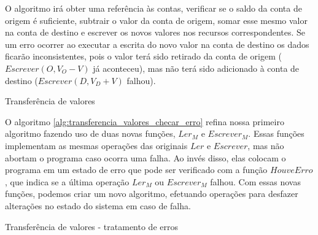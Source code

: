 \documentclass[11pt,twoside,a4paper]{book}
\begin{document}
O algoritmo irá obter uma referência às contas, verificar se o saldo da conta de origem é suficiente, subtrair o valor da conta de origem, somar esse mesmo valor na conta de destino e escrever os novos valores nos recursos correspondentes. Se um erro ocorrer ao executar a escrita do novo valor na conta de destino os dados ficarão inconsistentes, pois o valor terá sido retirado da conta de origem ($Escrever(O, V_O - V)$ já aconteceu), mas não terá sido adicionado à conta de destino ($Escrever(D, V_D + V)$ falhou).

\begin{algorithm}
\caption{Transferência de valores}
\label{alg:transferencia_valores_sem_transacao}
\end{algorithm}

O algoritmo \ref{alg:transferencia_valores_checar_erro} refina nossa primeiro algoritmo fazendo uso de duas novas funções, $Ler_M$ e $Escrever_M$. Essas funções implementam as mesmas operações das originais $Ler$ e $Escrever$, mas não abortam o programa caso ocorra uma falha. Ao invés disso, elas colocam o programa em um estado de erro que pode ser verificado com a função $HouveErro$, que indica se a última operação $Ler_M$ ou $Escrever_M$ falhou. Com essas novas funções, podemos criar um novo algoritmo, efetuando operações para desfazer alterações no estado do sistema em caso de falha.

\begin{algorithm}
\caption{Transferência de valores - tratamento de erros}
\label{alg:transferencia_valores_checar_erro}
\end{algorithm}
\end{document}
